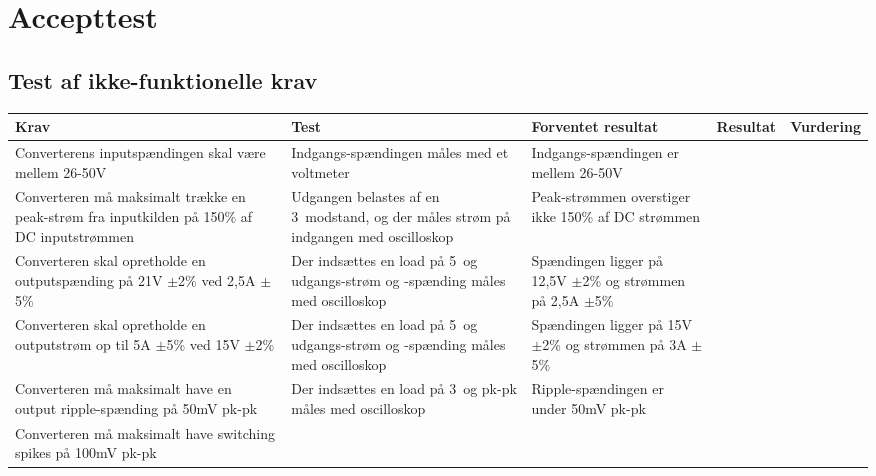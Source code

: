 \chapter{Accepttest}




\section{Test af ikke-funktionelle krav}

\begin{tabularx}{\textwidth}{|X|X|X|X|X|}
	\hline
	\textbf{Krav} & \textbf{Test} & \textbf{Forventet resultat} & \textbf{Resultat} & \textbf{Vurdering} \\ \hline
	Converterens inputspændingen skal være mellem 26-50V & Indgangs-spændingen måles med et voltmeter & Indgangs-spændingen er mellem 26-50V && \\ \hline
	Converteren må maksimalt trække en peak-strøm fra inputkilden på 150\% af DC inputstrømmen & Udgangen belastes af en 3\ohm\ modstand, og der måles strøm på indgangen med oscilloskop & Peak-strømmen overstiger ikke 150\% af DC strømmen & & \\ \hline
	Converteren skal opretholde en outputspænding på 21V $\pm$2\% ved 2,5A $\pm$5\% & Der indsættes en load på 5\ohm\ og udgangs-strøm og -spænding måles med oscilloskop & Spændingen ligger på 12,5V $\pm$2\% og strømmen på 2,5A $\pm$5\% && \\ \hline
	Converteren skal opretholde en outputstrøm op til 5A $\pm$5\% ved 15V $\pm$2\% & Der indsættes en load på 5\ohm\ og udgangs-strøm og -spænding måles med oscilloskop & Spændingen ligger på 15V $\pm$2\% og strømmen på 3A $\pm$5\% && \\ \hline
	Converteren må maksimalt have en output ripple-spænding på 50mV pk-pk & Der indsættes en load på 3\ohm\ og pk-pk måles med oscilloskop & Ripple-spændingen er under 50mV pk-pk && \\ \hline
	Converteren må maksimalt have switching spikes på 100mV pk-pk &  &  && \\ \hline
\end{tabularx}



